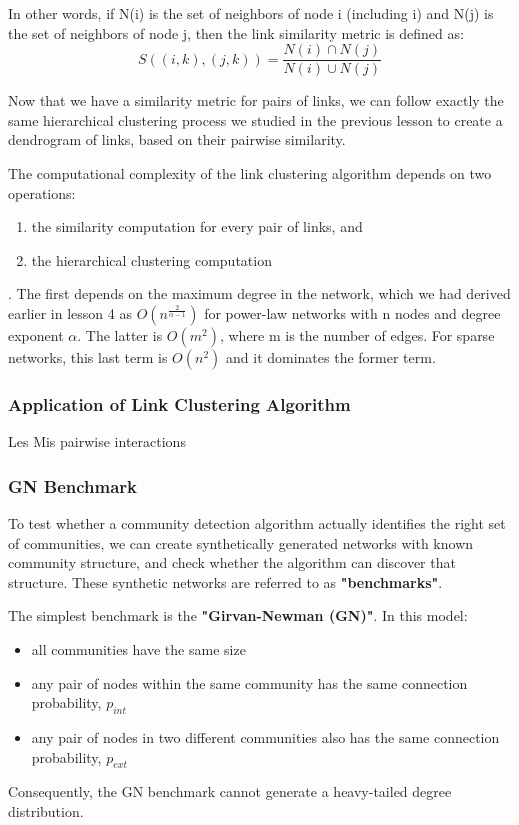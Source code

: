 \documentclass[11pt]{scrartcl} %
\begin{document}
In other words, if N(i) is the set of  neighbors of node i (including i) and N(j) is the set of neighbors of node j, then the link similarity metric is defined as:
\[ S((i,k),(j,k)) = \frac{N(i) \cap N(j)}{N(i) \cup N(j)} \]

Now that we have a similarity metric for pairs of links, we can follow exactly the same hierarchical clustering process we studied in the previous lesson to create a dendrogram of links, based on their pairwise similarity. 

The computational complexity of the link clustering algorithm depends on two operations: 
\begin{enumerate}
	\item the similarity computation for every pair of links, and
	\item the hierarchical clustering computation
\end{enumerate}. The first depends on the maximum degree in the network, which we had derived earlier in lesson 4 as $O(n^{\frac{2}{\alpha-1}})$ for power-law networks with n nodes and degree exponent $\alpha$. The latter is $O(m^2)$, where m is the number of edges. For sparse networks, this last term is $O(n^2)$ and it dominates the former term.

\subsubsection{Application of Link Clustering Algorithm}
Les Mis pairwise interactions

\subsubsection{GN Benchmark}
To test whether a community detection algorithm actually identifies the right set of communities, we can create synthetically generated networks with known community structure, and check whether the algorithm can discover that structure. These synthetic networks are referred to as \textbf{"benchmarks"}.

The simplest benchmark is the \textbf{"Girvan-Newman (GN)"}. In this model:
\begin{itemize}
	\item all communities have the same size
	\item any pair of nodes within the same community has the same connection probability, $p_{int}$
	\item any pair of nodes in two different communities also has the same connection probability, $p_{ext}$
\end{itemize}
Consequently, the GN benchmark cannot generate a heavy-tailed degree distribution. 
\end{document}
